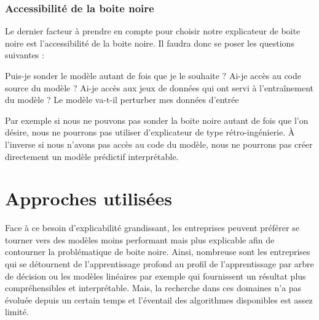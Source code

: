 \subsubsection{Accessibilité de la boite noire}
Le dernier facteur à prendre en compte pour choisir notre explicateur de boite noire est l'accessibilité de la boite noire. Il faudra donc se poser les questions suivantes :\par
Puis-je sonder le modèle autant de fois que je le souhaite ? Ai-je accès au code source du modèle ? Ai-je accès aux jeux de données qui ont servi à l'entraînement du modèle ? Le modèle va-t-il perturber mes données d'entrée\par
Par exemple si nous ne pouvons pas sonder la boite noire autant de fois que l'on désire, nous ne pourrons pas utiliser d'explicateur de type rétro-ingénierie. À l'inverse si nous n'avons pas accès au code du modèle, nous ne pourrons pas créer directement un modèle prédictif interprétable.


\section{Approches utilisées}
Face à ce besoin d'explicabilité grandissant, les entreprises peuvent préférer se tourner vers des modèles moins performant mais plus explicable afin de contourner la problématique de boite noire. Ainsi, nombreuse sont les entreprises qui se détournent de l'apprentissage profond au profil de l'apprentissage par arbre de décision ou les modèles linéaires par exemple qui fournissent un résultat plus compréhensibles et interprétable. Mais, la recherche dans ces domaines n'a pas évoluée depuis un certain temps et l'éventail des algorithmes disponibles est assez limité.


